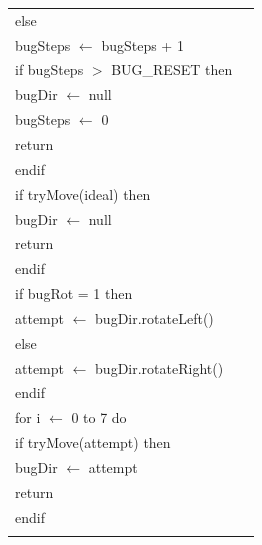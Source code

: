 \documentclass{article}
\newenvironment{pseudobox}
{
\centering
\begin{longtable}{|p{0.94\linewidth}|}
\hline
}
{
\\ \hline
\end{longtable}
\vspace{0.05cm}
}
\begin{document}
\begin{pseudobox}
\hspace*{1em} else \\
\hspace*{2em} bugSteps $\leftarrow$ bugSteps + 1 \\

\hspace*{2em} if bugSteps $>$ BUG\_RESET then \\
\hspace*{3em} bugDir $\leftarrow$ null \\
\hspace*{3em} bugSteps $\leftarrow$ 0 \\
\hspace*{3em} return \\
\hspace*{2em} endif \\

\hspace*{2em} if tryMove(ideal) then \\
\hspace*{3em} bugDir $\leftarrow$ null \\
\hspace*{3em} return \\
\hspace*{2em} endif \\

\hspace*{2em} if bugRot = 1 then \\
\hspace*{3em} attempt $\leftarrow$ bugDir.rotateLeft() \\
\hspace*{2em} else \\
\hspace*{3em} attempt $\leftarrow$ bugDir.rotateRight() \\
\hspace*{2em} endif \\

\hspace*{2em} for i $\leftarrow$ 0 to 7 do \\
\hspace*{3em} if tryMove(attempt) then \\
\hspace*{4em} bugDir $\leftarrow$ attempt \\
\hspace*{4em} return \\
\hspace*{3em} endif \\


\end{pseudobox}
\end{document}
